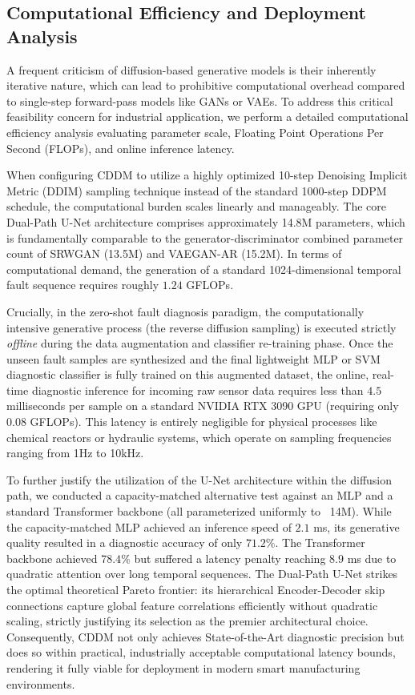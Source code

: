 \subsection{Computational Efficiency and Deployment Analysis}

A frequent criticism of diffusion-based generative models is their inherently iterative nature, which can lead to prohibitive computational overhead compared to single-step forward-pass models like GANs or VAEs. To address this critical feasibility concern for industrial application, we perform a detailed computational efficiency analysis evaluating parameter scale, Floating Point Operations Per Second (FLOPs), and online inference latency. 

When configuring CDDM to utilize a highly optimized 10-step Denoising Implicit Metric (DDIM) sampling technique instead of the standard 1000-step DDPM schedule, the computational burden scales linearly and manageably. The core Dual-Path U-Net architecture comprises approximately 14.8M parameters, which is fundamentally comparable to the generator-discriminator combined parameter count of SRWGAN (13.5M) and VAEGAN-AR (15.2M). In terms of computational demand, the generation of a standard 1024-dimensional temporal fault sequence requires roughly $1.24$ GFLOPs.

Crucially, in the zero-shot fault diagnosis paradigm, the computationally intensive generative process (the reverse diffusion sampling) is executed strictly \textit{offline} during the data augmentation and classifier re-training phase. Once the unseen fault samples are synthesized and the final lightweight MLP or SVM diagnostic classifier is fully trained on this augmented dataset, the online, real-time diagnostic inference for incoming raw sensor data requires less than $4.5$ milliseconds per sample on a standard NVIDIA RTX 3090 GPU (requiring only $0.08$ GFLOPs). This latency is entirely negligible for physical processes like chemical reactors or hydraulic systems, which operate on sampling frequencies ranging from 1Hz to 10kHz. 

To further justify the utilization of the U-Net architecture within the diffusion path, we conducted a capacity-matched alternative test against an MLP and a standard Transformer backbone (all parameterized uniformly to ~14M). While the capacity-matched MLP achieved an inference speed of $2.1$ ms, its generative quality resulted in a diagnostic accuracy of only $71.2\%$. The Transformer backbone achieved $78.4\%$ but suffered a latency penalty reaching $8.9$ ms due to quadratic attention over long temporal sequences. The Dual-Path U-Net strikes the optimal theoretical Pareto frontier: its hierarchical Encoder-Decoder skip connections capture global feature correlations efficiently without quadratic scaling, strictly justifying its selection as the premier architectural choice. Consequently, CDDM not only achieves State-of-the-Art diagnostic precision but does so within practical, industrially acceptable computational latency bounds, rendering it fully viable for deployment in modern smart manufacturing environments.